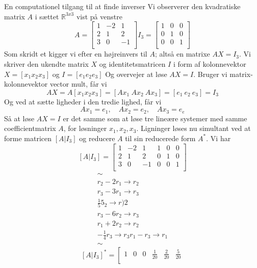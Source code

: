 \documentclass[a4paper,fleqn]{article}
\newcommand{\RR}{\mathbb{R}}
\begin{document}
	\begin{example}{En computationel tilgang til at finde inverser}{}
		Vi observerer den kvadratiske matrix $A$ i sættet $\RR^{3x3}$ vist på venstre
		\[A = \begin{bmatrix}
				1 & -2 & 1\\
				2 & 1 & 2\\
				3 & 0 & -1\\
		      \end{bmatrix} I_3 = \begin{bmatrix}
				1&0&0\\
				0&1&0\\
				0&0&1\\
		      \end{bmatrix}
		\]
		Som skridt et kigger vi efter en højreinvers til $A$; altså en matrixe $AX = I_3$.
		Vi skriver den ukendte matrix $X$ og identitetsmatricen $I$ i form af kolonnevektor
		$X = [x_1 x_2 x_3]$ og $I = [e_1 e_2 e_3]$ Og overvejer at løse $AX = I$. Bruger
		vi matrix-kolonnevektor vector mult, får vi 
		\[ AX = A[x_1 x_2 x_3] = [Ax_1\ Ax_2\ Ax_3] = [e_1\ e_2\ e_3] = I_3\]
		Og ved at sætte ligheder i den tredie lighed, får vi
		\[ Ax_1 = e_1,\quad Ax_2 = e_2,\quad Ax_3 = e_e \]
		Så at løse $AX=I$ er det samme som at løse tre lineære systemer med samme
		coefficientmatrix $A$, for løsninger $x_1, x_2, x_3$. Ligninger løses nu simultant
		ved at forme matricen $[A|I_3]$ og reducere $A$ til sin reducerede form $A^*$.
		Vi har
		\[ [A|I_3] = \left[ \begin{array}{rrr|rrr}
					1 & -2&1&1&0&0\\
					2&1&2&0&1&0\\
					3&0&-1&0&0&1\\
				\end{array}
		\right]\]
		\[\begin{array}{c}
				\sim\\
				r_2 - 2r_1 \rightarrow r_2\\
				r_3 - 3r_1 \rightarrow r_3 \\
				\frac{1}{5}5_2 \rightarrow r)2\\
				r_3 - 6r_2 \rightarrow r_3\\
				r_1 + 2r_2 \rightarrow r_2\\
				-\frac{1}{4}r_3 \rightarrow r_3
				r_1 - r_3 \rightarrow r_1\\
				\sim
		\end{array}\]
		\[ [A|I_3]^* = \left[ \begin{array}{rrr|rrr}
				1&0&0&\frac{1}{20}&\frac{2}{20}&\frac{5}{20}\\

\end{array}\]
\end{example}
\end{document}
